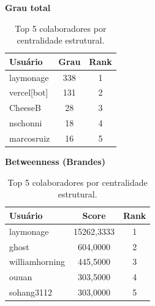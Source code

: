 \documentclass[12pt]{article}
\begin{document}
\begin{table}[H]
\centering
\caption{Top 5 colaboradores por centralidade estrutural.}
\small
\begin{minipage}[t]{0.48\textwidth}
\centering
\textbf{Grau total}\\[2pt]
\begin{tabular}{|l|c|c|}
\hline
\textbf{Usuário} & \textbf{Grau} & \textbf{Rank} \\
\hline laymonage & 338 & 1 \\
\hline vercel[bot] & 131 & 2 \\
\hline CheeseB & 28 & 3 \\
\hline nschonni & 18 & 4 \\
\hline marcosruiz & 16 & 5 \\
\hline
\end{tabular}
\label{tab:grau}
\end{minipage}\hfill
\begin{minipage}[t]{0.48\textwidth}
\centering
\textbf{Betweenness (Brandes)}\\[2pt]
\begin{tabular}{|l|c|c|}
\hline
\textbf{Usuário} & \textbf{Score} & \textbf{Rank} \\
\hline laymonage & 15262,3333 & 1 \\
\hline ghost & 604,0000 & 2 \\
\hline williamhorning & 445,5000 & 3 \\
\hline ouuan & 303,5000 & 4 \\
\hline sohang3112 & 303,0000 & 5 \\
\hline
\end{tabular}
\label{tab:betweenness}
\end{minipage}

\vspace{6pt}


\end{table}
\end{document}
